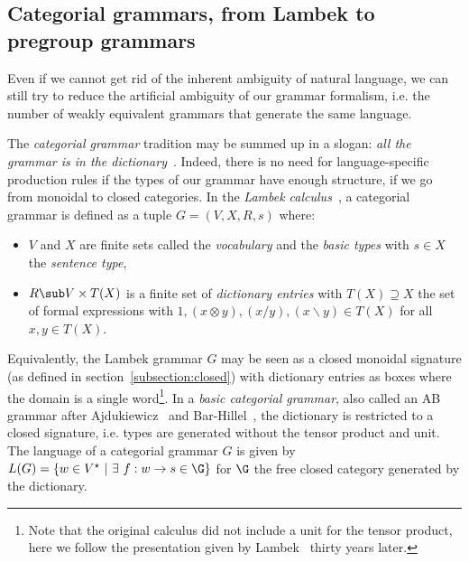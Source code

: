 
\subsection{Categorial grammars, from Lambek to pregroup grammars}

Even if we cannot get rid of the inherent ambiguity of natural language, we can still try to reduce the artificial ambiguity of our grammar formalism, i.e. the number of weakly equivalent grammars that generate the same language.

The \emph{categorial grammar} tradition may be summed up in a slogan: \emph{all the grammar is in the dictionary}~\cite{Preller07}.
Indeed, there is no need for language-specific production rules if the types of our grammar have enough structure, if we go from monoidal to closed categories.
In the \emph{Lambek calculus}~\cite{Lambek58}, a categorial grammar is defined as a tuple $G = (V, X, R, s)$ where:
\begin{itemize}
\item $V$ and $X$ are finite sets called the \emph{vocabulary} and the \emph{basic types} with $s \in X$ the \emph{sentence type},
\item $R \sub V \times T(X)$ is a finite set of \emph{dictionary entries} with $T(X) \supseteq X$ the set of formal expressions with $1, (x \otimes y), (x / y), (x \backslash y) \in T(X)$ for all $x, y \in T(X)$.
\end{itemize}
Equivalently, the Lambek grammar $G$ may be seen as a closed monoidal signature (as defined in section~\ref{subsection:closed}) with dictionary entries as boxes where the domain is a single word\footnote
{Note that the original calculus did not include a unit for the tensor product, here we follow the presentation given by Lambek~\cite{Lambek88} thirty years later.}.
In a \emph{basic categorial grammar}, also called an AB grammar after Ajdukiewicz~\cite{Ajdukiewicz35} and Bar-Hillel~\cite{Bar-Hillel54}, the dictionary is restricted to a closed signature, i.e. types are generated without the tensor product and unit.
The language of a categorial grammar $G$ is given by $L(G) = \{ w \in V^\star \ \vert \ \exists \ f : w \to s \in \G \}$ for $\G$ the free closed category generated by the dictionary.

